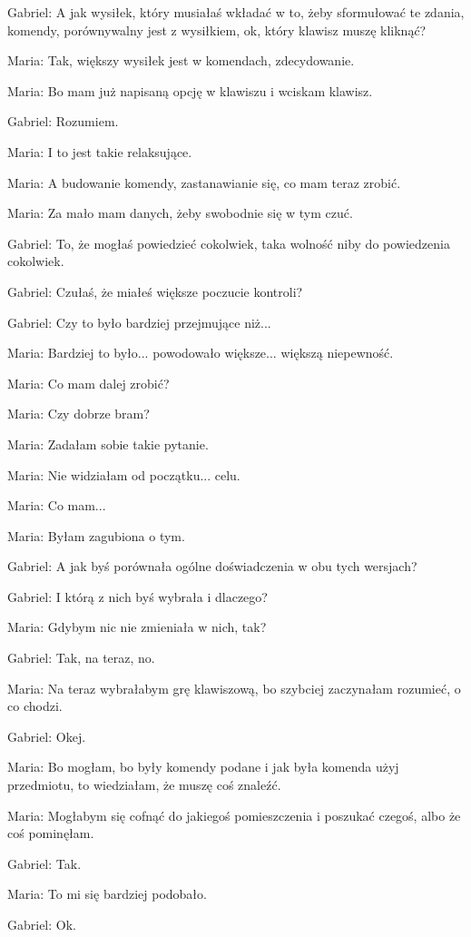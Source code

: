 Gabriel: A jak wysiłek, który musiałaś wkładać w to, żeby sformułować te zdania, komendy, porównywalny jest z wysiłkiem, ok, który klawisz muszę kliknąć?

Maria: Tak, większy wysiłek jest w komendach, zdecydowanie.

Maria: Bo mam już napisaną opcję w klawiszu i wciskam klawisz.

Gabriel: Rozumiem.

Maria: I to jest takie relaksujące.

Maria: A budowanie komendy, zastanawianie się, co mam teraz zrobić.

Maria: Za mało mam danych, żeby swobodnie się w tym czuć.

Gabriel: To, że mogłaś powiedzieć cokolwiek, taka wolność niby do powiedzenia cokolwiek.

Gabriel: Czułaś, że miałeś większe poczucie kontroli?

Gabriel: Czy to było bardziej przejmujące niż...

Maria: Bardziej to było... powodowało większe... większą niepewność.

Maria: Co mam dalej zrobić?

Maria: Czy dobrze bram?

Maria: Zadałam sobie takie pytanie.

Maria: Nie widziałam od początku... celu.

Maria: Co mam...

Maria: Byłam zagubiona o tym.

Gabriel: A jak byś porównała ogólne doświadczenia w obu tych wersjach?

Gabriel: I którą z nich byś wybrała i dlaczego?

Maria: Gdybym nic nie zmieniała w nich, tak?

Gabriel: Tak, na teraz, no.

Maria: Na teraz wybrałabym grę klawiszową, bo szybciej zaczynałam rozumieć, o co chodzi.

Gabriel: Okej.

Maria: Bo mogłam, bo były komendy podane i jak była komenda użyj przedmiotu, to wiedziałam, że muszę coś znaleźć.

Maria: Mogłabym się cofnąć do jakiegoś pomieszczenia i poszukać czegoś, albo że coś pominęłam.

Gabriel: Tak.

Maria: To mi się bardziej podobało.

Gabriel: Ok.

